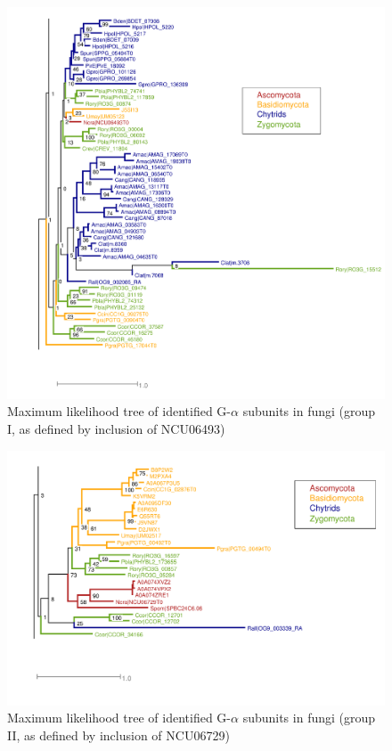 \begin{figure}[hb]
  \centering
  \includegraphics{./Chapter_RhodAux/img/Galpha_tree_grp1.png}
  \caption[G$\alpha$ tree, group 1]{Maximum likelihood tree of identified G-$\alpha$ subunits in fungi (group I, as defined by inclusion of NCU06493)}
  \label{fig:ChRhodA_GalphaTree1}
\end{figure}

\begin{figure}[hb]
  \centering
  \includegraphics{./Chapter_RhodAux/img/Galpha_tree_grp2.png}
  \caption[G$\alpha$ tree, group2]{Maximum likelihood tree of identified G-$\alpha$ subunits in fungi (group II, as defined by inclusion of NCU06729)}
  \label{fig:ChRhodA_GalphaTree2}
\end{figure}

